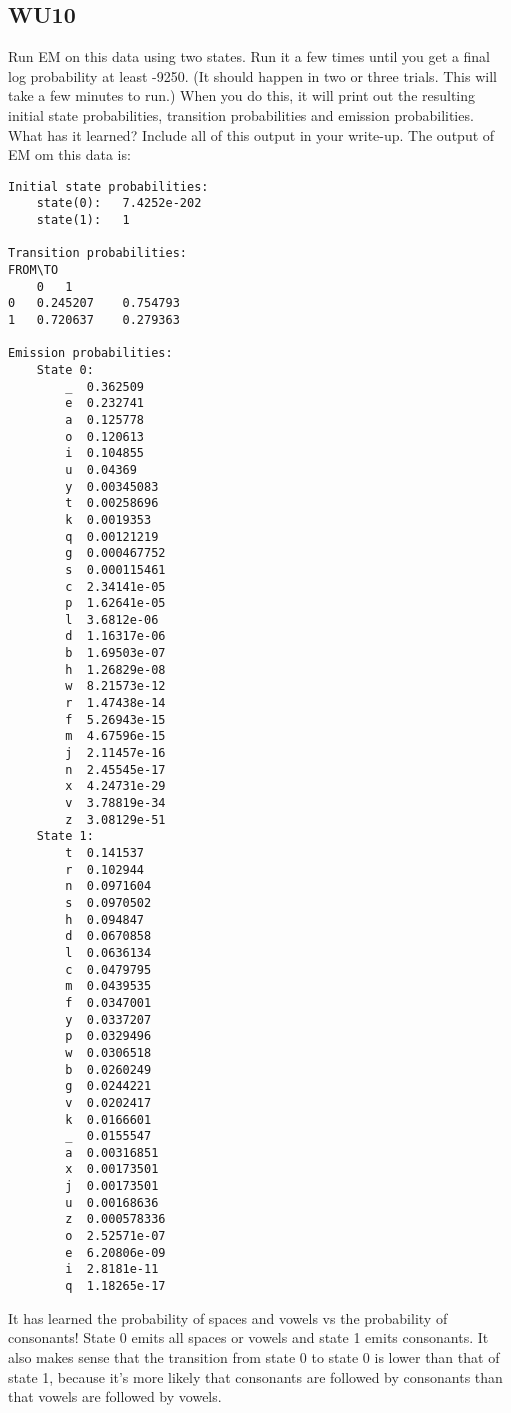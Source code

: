 \documentclass[a4paper,11pt]{article}
\begin{document}
\subsection{WU10}
\textsf{Run EM on this data using two states. 
Run it a few times until you get a final log probability at least -9250. 
(It should happen in two or three trials. This will take a few minutes to run.) 
When you do this, it will print out the resulting initial state probabilities, 
transition probabilities and emission probabilities. 
What has it learned? Include all of this output in your
write-up.}\vspace{0.1in}
The output of EM om this data is:
\begin{verbatim}
Initial state probabilities:
	state(0):	7.4252e-202
	state(1):	1

Transition probabilities:
FROM\TO
	0 	1 
0 	0.245207 	0.754793 
1 	0.720637 	0.279363 

Emission probabilities:
	State 0:
		_  0.362509
		e  0.232741
		a  0.125778
		o  0.120613
		i  0.104855
		u  0.04369
		y  0.00345083
		t  0.00258696
		k  0.0019353
		q  0.00121219
		g  0.000467752
		s  0.000115461
		c  2.34141e-05
		p  1.62641e-05
		l  3.6812e-06
		d  1.16317e-06
		b  1.69503e-07
		h  1.26829e-08
		w  8.21573e-12
		r  1.47438e-14
		f  5.26943e-15
		m  4.67596e-15
		j  2.11457e-16
		n  2.45545e-17
		x  4.24731e-29
		v  3.78819e-34
		z  3.08129e-51
	State 1:
		t  0.141537
		r  0.102944
		n  0.0971604
		s  0.0970502
		h  0.094847
		d  0.0670858
		l  0.0636134
		c  0.0479795
		m  0.0439535
		f  0.0347001
		y  0.0337207
		p  0.0329496
		w  0.0306518
		b  0.0260249
		g  0.0244221
		v  0.0202417
		k  0.0166601
		_  0.0155547
		a  0.00316851
		x  0.00173501
		j  0.00173501
		u  0.00168636
		z  0.000578336
		o  2.52571e-07
		e  6.20806e-09
		i  2.8181e-11
		q  1.18265e-17
\end{verbatim}

It has learned the probability of spaces and vowels vs the probability
of consonants! State 0 emits all spaces or vowels and state 1 emits
consonants. It also makes sense that the transition from state 0 to
state 0 is lower than that of state 1, because it's more likely that
consonants are followed by consonants than that vowels are followed by vowels.
\end{document}
